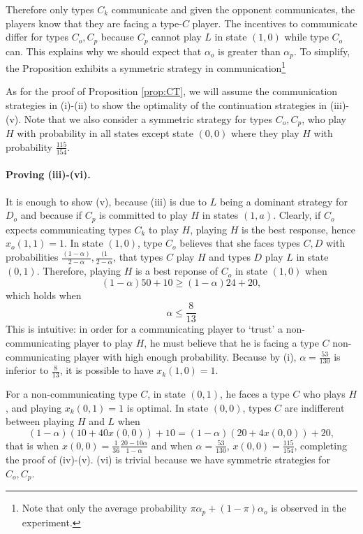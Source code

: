 \documentclass[12pt]{article}
\theoremstyle{break}
\begin{document}
Therefore only types $C_k$ communicate and given the opponent communicates, the players know that they are facing a type-$C$ player. The incentives to communicate differ for types $C_o,C_p$ because $C_p$ cannot play $L$ in state $(1,0)$ while type $C_o$ can. This explains why we should expect that $\alpha_o$ is greater than $\alpha_p$. To simplify, the Proposition exhibits a symmetric strategy in communication\footnote{Note that only the average probability $\pi\alpha_p+(1-\pi)\alpha_o$ is observed in the experiment.
}

As for the proof of Proposition \ref{prop:CT}, we will assume the communication strategies in (i)-(ii) to show the optimality of the continuation strategies in (iii)-(v). Note that we also consider a symmetric strategy for types $C_o,C_p$, who play $H$ with probability in all states except state $(0,0)$ where they play $H$ with probability $\frac{115}{154}$.

\paragraph{Proving (iii)-(vi).}  It is enough to show (v), because (iii) is due to $L$ being a dominant strategy  for $D_o$ and because if $C_p$ is committed to play $H$ in states $(1,a)$. Clearly, if $C_o$ expects communicating types $C_k$ to play $H$, playing $H$ is the best response, hence $x_o(1,1)=1$. In state $(1,0)$, type $C_o$ believes that she faces types $C,D$ with probabilities $\frac{(1-\alpha)}{2-\alpha},\frac{(1}{2-\alpha}$, that types $C$ play $H$ and types $D$ play $L$ in state $(0,1)$. Therefore, playing $H$ is a best reponse of $C_o$ in state $(1,0)$ when
%
\[
(1-\alpha)50+10\geq (1-\alpha)24+20,
\]
%
which holds when 
%
\begin{equation}\label{cond-FC-H-10}
	\alpha\leq \frac{8}{13}
\end{equation}
%
This is intuitive: in order for a communicating player to `trust' a non-communicating player to play $H$, he must believe that he is facing a type $C$ non-communicating player with high enough probability. Because by (i), $\alpha=\frac{53}{130}$ is inferior to $\frac{8}{13}$, it is possible to have $x_k(1,0)=1$. 

For a non-communicating type $C$, in state $(0,1)$, he faces a type $C$ who plays $H$, and playing $x_k(0,1)=1$ is optimal. In state $(0,0)$, types $C$ are indifferent between playing $H$ and $L$ when 
%
\[
(1-\alpha)(10+40 x(0,0))+10=(1-\alpha)(20+4x(0,0))+20,
\]
%
that is when $x(0,0)=\frac{1}{36}\frac{20-10\alpha}{1-\alpha}$ and when $\alpha=\frac{53}{130}$, $x(0,0)=\frac{115}{154}$, completing the proof of (iv)-(v). (vi) is trivial because we have symmetric strategies for $C_o,C_p$. 
\end{document}
